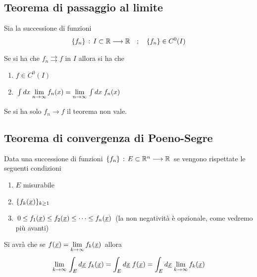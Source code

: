 \begin{figure}[!htb]
\end{figure}

\subsection{Teorema di passaggio al limite}

Sia la successione di funzioni
\begin{align}
	\{f_n\} \, : \, I \subset \mathbb{R} \longrightarrow \mathbb{R} \quad ; \quad \{f_n\} \in C^0(I)
\end{align}

Se si ha che $f_n \rightrightarrows f$ in $I$ allora si ha che
\begin{enumerate}
	\item $f\in C^0(I)$
	\item $\int dx \; \underset{n \rightarrow \infty}{\lim} \,f_n(x)=  \underset{n \rightarrow \infty}{\lim} \, \int dx \; f_n(x)$ 
\end{enumerate}

Se si ha solo $f_n \longrightarrow f$ il teorema non vale.

\subsection{Teorema di convergenza di Poeno-Segre}

Data una successione di funzioni $\{f_n\} \, : \, E \subset \mathbb{R}^n \longrightarrow \mathbb{R}$ se vengono rispettate le seguenti condizioni
\begin{enumerate}
	\item $E$ misurabile
	\item $\{f_k(\underline{x})\}_{k\geq 1} $
	\item $0\leq f_1(\underline{x}) \leq f_2(\underline{x}) \leq \dots \leq f_n(\underline{x}) $ (la non negatività è opzionale, come vedremo più avanti)
\end{enumerate}

Si avrà che se $f(\underline{x})=\underset{k \rightarrow \infty}{\lim} \,f_k(\underline{x})$ allora
\begin{align}
	\underset{k \rightarrow \infty}{\lim} \, \int_{E} d\underline{x} \; f_k(\underline{x})= \int_{E} d\underline{x} \; f(\underline{x})= \int_{E} d\underline{x} \;\underset{k \rightarrow \infty}{\lim} \,  f_k(\underline{x})
\end{align}

